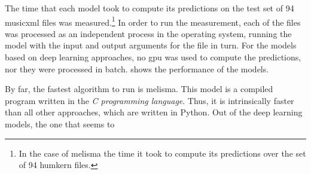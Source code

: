 
The time that each model took to compute its predictions on
the test set of 94 \gls{musicxml} files was
measured.\footnote{In the case of \gls{melisma} the time it
took to compute its predictions over the set of 94
\gls{humkern files}.} In order to run the measurement, each
of the files was processed as an independent process in the
operating system, running the model with the input and
output arguments for the file in turn. For the models based
on deep learning approaches, no \gls{gpu} was used to
compute the predictions, nor they were processed in batch.
 shows the performance of the
models.


By far, the fastest algorithm to run is \gls{melisma}. This
model is a compiled program written in the \emph{C
programming language}. Thus, it is intrinsically faster than
all other approaches, which are written in Python. Out of
the deep learning models, the one that seems to 
